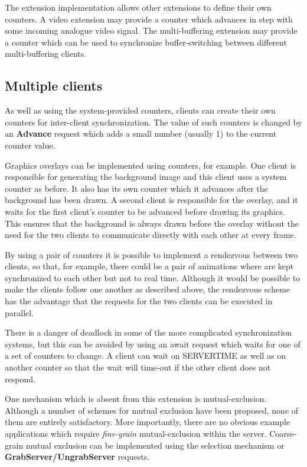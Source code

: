 The extension implementation allows other extensions to define their own
counters. A video extension may provide a counter which advances in step with
some incoming analogue video signal. The multi-buffering extension may provide
a counter which can be used to synchronize buffer-switching between different
multi-buffering clients.

\subsection*{Multiple clients}

As well as using the system-provided counters, clients can
create their own counters for inter-client synchronization. The value of
such counters is changed by an {\bf Advance} request which adds a small number
(usually 1) to the current counter value.

Graphics overlays can be implemented using counters, for example. One client
is responsible for generating the background image and this client uses a
system counter as before. It also has its own counter which it advances after
the background has been drawn. A second client is responsible for the overlay,
and it waits for the first client's counter to be advanced before drawing its
graphics. This ensures that the background is always drawn before the overlay
without the need for the two clients to communicate directly with each other
at every frame.

By using a pair of counters it is possible to implement a rendezvous between
two clients, so that, for example, there could be a pair of animations where
are kept synchronized to each other but not to real time. Although it would be
possible to make the clients follow one another as described above, the
rendezvous scheme has the advantage that the requests for the two clients can
be executed in parallel.

There is a danger of deadlock in some of the more complicated synchronization
systems, but this can be avoided by using an await request which waits for one
of a set of counters to change. A client can wait on SERVERTIME as well as on
another counter so that the wait will time-out if the other client does not
respond.

One mechanism which is absent from this extension is mutual-exclusion.
Although a number of schemes for mutual exclusion have been proposed, none of
them are entirely satisfactory. More importantly, there are no obvious
example applications which require {\it fine-grain} mutual-exclusion within
the server. Coarse-grain mutual exclusion can be implemented using the
selection mechanism or {\bf GrabServer/UngrabServer} requests.

